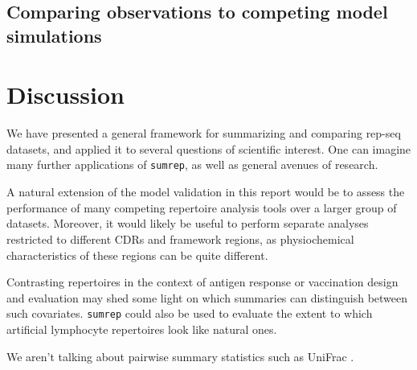 \documentclass{article}
\begin{document}
\subsection*{Comparing observations to competing model simulations}

\section*{Discussion}
We have presented a general framework for summarizing and comparing rep-seq datasets, and applied it to several questions of scientific interest.
One can imagine many further applications of \texttt{sumrep}, as well as general avenues of research.

A natural extension of the model validation in this report would be to assess the performance of many competing repertoire analysis tools over a larger group of datasets.
Moreover, it would likely be useful to perform separate analyses restricted to different CDRs and framework regions, as physiochemical characteristics of these regions can be quite different.


Contrasting repertoires in the context of antigen response or vaccination design and evaluation may shed some light on which summaries can distinguish between such covariates.
\texttt{sumrep} could also be used to evaluate the extent to which artificial lymphocyte repertoires look like natural ones\cite{Finlay2012}.

We aren't talking about pairwise summary statistics such as UniFrac \cite{De_Bourcy2017-pu}.



\end{document}
